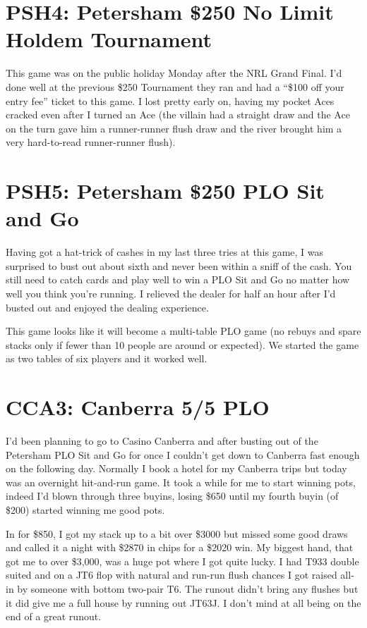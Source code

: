 \section*{PSH4: Petersham \$250 No Limit Holdem Tournament}

This game was on the public holiday Monday after the NRL Grand
Final. I'd done well at the previous \$250 Tournament they ran and had
a ``\$100 off your entry fee'' ticket to this game. I lost pretty
early on, having my pocket Aces cracked even after I turned an Ace
(the villain had a straight draw and the Ace on the turn gave him a
runner-runner flush draw and the river brought him a very hard-to-read
runner-runner flush).

\section*{PSH5: Petersham \$250 PLO Sit and Go}

Having got a hat-trick of cashes in my last three tries at this game,
I was surprised to bust out about sixth and never been within a sniff
of the cash. You still need to catch cards and play well to win a PLO
Sit and Go no matter how well you think you're running. I relieved the
dealer for half an hour after I'd busted out and enjoyed the dealing
experience.

This game looks like it will become a multi-table PLO game (no rebuys
and spare stacks only if fewer than 10 people are around or
expected). We started the game as two tables of six players and it
worked well.

\section*{CCA3: Canberra 5/5 PLO}

I'd been planning to go to Casino Canberra and after busting out of
the Petersham PLO Sit and Go for once I couldn't get down to Canberra
fast enough on the following day. Normally I book a hotel for my
Canberra trips but today was an overnight hit-and-run game. It took a
while for me to start winning pots, indeed I'd blown through three
buyins, losing \$650 until my fourth buyin (of \$200) started winning
me good pots.

In for \$850, I got my stack up to a bit over \$3000 but missed some
good draws and called it a night with \$2870 in chips for a \$2020
win. My biggest hand, that got me to over \$3,000, was a huge pot
where I got quite lucky. I had T933 double suited and on a JT6 flop
with natural and run-run flush chances I got raised all-in by someone
with bottom two-pair T6. The runout didn't bring any flushes but it
did give me a full house by running out JT63J. I don't mind at all
being on the end of a great runout.

